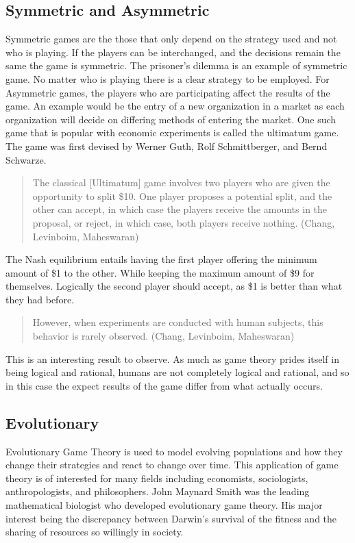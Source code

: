 \documentclass[12pt]{article}
\begin{document}
 	\subsection{Symmetric and Asymmetric}
 		Symmetric games are the those that only depend on the strategy used and not who is playing. If the players can be interchanged, and the decisions remain the same the game is symmetric. The prisoner's dilemma is an example of symmetric game. No matter who is playing there is a clear strategy to be employed. For Asymmetric games, the players who are participating affect the results of the game. An example would be the entry of a new organization in a market as each organization will decide on differing methods of entering the market. One such game that is popular with economic experiments is called the ultimatum game. The game was first devised by Werner Guth, Rolf Schmittberger, and Bernd Schwarze.
 		\begin{quotation}
 			 The classical [Ultimatum] game involves two players who are given the opportunity to split \$10. One player proposes a potential split, and the other can accept, in which case the players receive the amounts in the proposal, or reject, in which case, both players receive nothing. (Chang, Levinboim, Maheswaran)
 		\end{quotation} 
 			 The Nash equilibrium entails having the first player offering the minimum amount of \$1 to the other. While keeping the maximum amount of \$9 for themselves. Logically the second player should accept, as \$1 is better than what they had before. 
 			 
 			 \begin{quote}
 			 	However, when experiments are conducted with human subjects, this behavior is rarely observed.  (Chang, Levinboim, Maheswaran)
 			\end{quote}
 		This is an interesting result to observe. As much as game theory prides itself in being logical and rational, humans are not completely logical and rational, and so in this case the expect results of the game differ from what actually occurs.
 	 \subsection{Evolutionary}
 	 	Evolutionary Game Theory is used to model evolving populations and how they change their strategies and react to change over time. This application of game theory is of interested for many fields including economists, sociologists, anthropologists, and philosophers. John Maynard Smith was the leading mathematical biologist who developed evolutionary game theory. His major interest being the discrepancy between Darwin's survival of the fitness and the sharing of resources so willingly in society.
\end{document}
